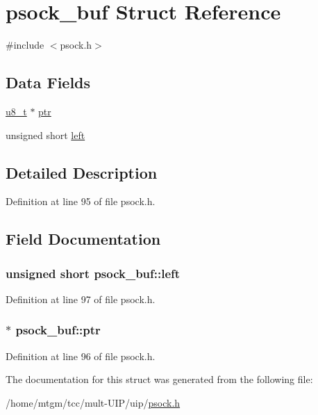 \hypertarget{structpsock__buf}{
\section{psock\_\-buf Struct Reference}
\label{structpsock__buf}
}


{\ttfamily \#include $<$psock.h$>$}

\subsection*{Data Fields}
\begin{DoxyCompactItemize}
\item 
\hyperlink{group__uipfw_ga4caecabca98b43919dd11be1c0d4cd8e}{u8\_\-t} $\ast$ \hyperlink{structpsock__buf_a5e8637b1514d03eb3eb12dc9a502e27e}{ptr}
\item 
unsigned short \hyperlink{structpsock__buf_a20fae11b540a561c622a0d74cb4b9f97}{left}
\end{DoxyCompactItemize}


\subsection{Detailed Description}


Definition at line 95 of file psock.h.



\subsection{Field Documentation}
\hypertarget{structpsock__buf_a20fae11b540a561c622a0d74cb4b9f97}{
\subsubsection[{left}]{\setlength{\rightskip}{0pt plus 5cm}unsigned short {\bf psock\_\-buf::left}}}
\label{structpsock__buf_a20fae11b540a561c622a0d74cb4b9f97}


Definition at line 97 of file psock.h.

\hypertarget{structpsock__buf_a5e8637b1514d03eb3eb12dc9a502e27e}{
\subsubsection[{ptr}]{$\ast$ {\bf psock\_\-buf::ptr}}}
\label{structpsock__buf_a5e8637b1514d03eb3eb12dc9a502e27e}


Definition at line 96 of file psock.h.



The documentation for this struct was generated from the following file:\begin{DoxyCompactItemize}
\item 
/home/mtgm/tcc/mult-\/UIP/uip/\hyperlink{psock_8h}{psock.h}\end{DoxyCompactItemize}
